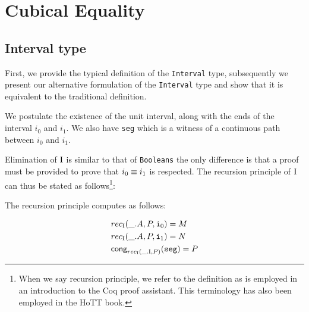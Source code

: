 \documentclass[12pt,twoside,maitrise]{dms}
\theoremstyle{definition}
\numberwithin{equation}{section}
\numberwithin{table}{chapter}
\numberwithin{figure}{chapter}
\newcommand\kw[1] {\textsf{#1}}
\newcommand\id[1] {\texttt{#1}}
\begin{document}
\chapter{Cubical Equality}
\section{Interval type}
First, we provide the typical definition of the \id{Interval} type, subsequently
we present our alternative formulation of the \id{Interval} type and show that
it is equivalent to the traditional definition.

\begin{prooftree*}
\end{prooftree*}

\begin{prooftree*}
\end{prooftree*}

\begin{prooftree*}
\end{prooftree*}

\begin{prooftree*}
\end{prooftree*}

We postulate the existence of the unit interval, along with the ends of the
interval \id{$i_0$} and \id{$i_1$}. We also have \id{seg} which is a witness of
a continuous path between \id{$i_0$} and \id{$i_1$}.

Elimination of $\mathrm{I}$ is similar to that of \id{Booleans} the only difference is
that a proof must be provided to prove that $\eqtype{i_0}{i_1}$ is respected.
The recursion principle of $\mathrm{I}$ can thus be stated as follows\footnote{When we
say recursion principle, we refer to the definition as is employed in an
introduction to the Coq proof assistant\cite{chlipala2022certified}. This
terminology has also been employed in the HoTT book\cite{HoTTbook}.}:

\begin{prooftree*}
\end{prooftree*}

The recursion principle computes as follows:

\begin{align*}
  & rec_{\bI}(\_ . A, P, \ileft) = M \\
  & rec_{\bI}(\_ . A, P, \iright) = N \\
  & \kw{cong}_{rec_{\bI}(\_ . \bI, P)}(\id{seg}) = P
\end{align*}
\end{document}
